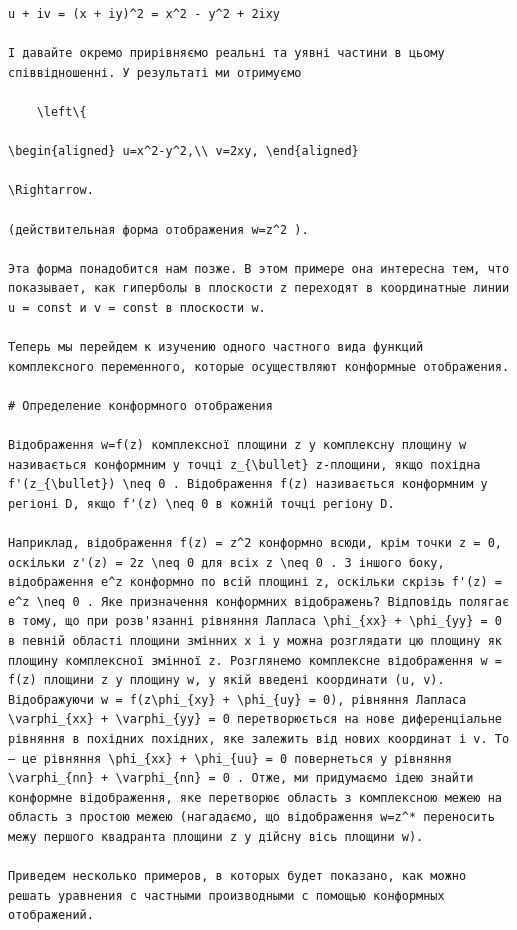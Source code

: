\documentclass[
  ukrainian,
]{article}
\begin{document}
\begin{verbatim}
u + iv = (x + iy)^2 = x^2 - y^2 + 2ixy

І давайте окремо прирівняємо реальні та уявні частини в цьому співвідношенні. У результаті ми отримуємо

    \left\{

\begin{aligned} u=x^2-y^2,\\ v=2xy, \end{aligned}

\Rightarrow.

(действительная форма отображения w=z^2 ).

Эта форма понадобится нам позже. В этом примере она интересна тем, что показывает, как гиперболы в плоскости z переходят в координатные линии u = const и v = const в плоскости w.

Теперь мы перейдем к изучению одного частного вида функций комплексного переменного, которые осуществляют конформные отображения.

# Определение конформного отображения

Відображення w=f(z) комплексної площини z у комплексну площину w називається конформним у точці z_{\bullet} z-площини, якщо похідна f'(z_{\bullet}) \neq 0 . Відображення f(z) називається конформним у регіоні D, якщо f'(z) \neq 0 в кожній точці регіону D.

Наприклад, відображення f(z) = z^2 конформно всюди, крім точки z = 0, оскільки z'(z) = 2z \neq 0 для всіх z \neq 0 . З іншого боку, відображення e^z конформно по всій площині z, оскільки скрізь f'(z) = e^z \neq 0 . Яке призначення конформних відображень? Відповідь полягає в тому, що при розв'язанні рівняння Лапласа \phi_{xx} + \phi_{yy} = 0 в певній області площини змінних x і y можна розглядати цю площину як площину комплексної змінної z. Розглянемо комплексне відображення w = f(z) площини z у площину w, у якій введені координати (u, v). Відображуючи w = f(z\phi_{xy} + \phi_{uy} = 0), рівняння Лапласа \varphi_{xx} + \varphi_{yy} = 0 перетворюється на нове диференціальне рівняння в похідних похідних, яке залежить від нових координат і v. To — це рівняння \phi_{xx} + \phi_{uu} = 0 повернеться у рівняння \varphi_{nn} + \varphi_{nn} = 0 . Отже, ми придумаємо ідею знайти конформне відображення, яке перетворює область з комплексною межею на область з простою межею (нагадаємо, що відображення w=z^* переносить межу першого квадранта площини z у дійсну вісь площини w).

Приведем несколько примеров, в которых будет показано, как можно решать уравнения с частными производными с помощью конформных отображений.


\end{verbatim}
\end{document}
